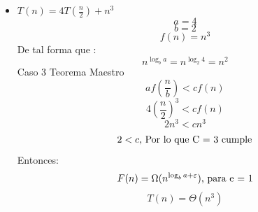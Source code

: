 \documentclass[10pt,a4paper]{article}
\begin{document}
\begin{itemize}
		\item $T(n) = 4T(\frac{n}{2})+n^{3}$
			\begin{equation*}
				a = 4
			\end{equation*}
			\begin{equation*}
				b = 2
			\end{equation*}
			\begin{equation*}
				f(n) = n^{3}
			\end{equation*}
			De tal forma que :
			\begin{equation*}
				n^{\log_{b}{a}} = n^{\log_{2}{4}} = n^{2}
			\end{equation*}
			Caso 3 Teorema Maestro
			\begin{equation*}
				af(\frac{n}{b}) < c f(n)
			\end{equation*}
			\begin{equation*}
				4(\frac{n}{2})^{3} < c f(n)
			\end{equation*}
			\begin{equation*}
				2n^{3} < cn^{3}
			\end{equation*}
			\begin{equation*}
				2 < c \textup{, Por lo que C = 3 cumple}
			\end{equation*}
			Entonces:
			\begin{equation*}
				F(n) = \Omega (n^{\log_{b}{a}+\varepsilon})  \textup{, para e = 1}
			\end{equation*}
			\begin{equation*}
				T(n) = \Theta(n^{3})
			\end{equation*}
			

\end{itemize}
\end{document}
